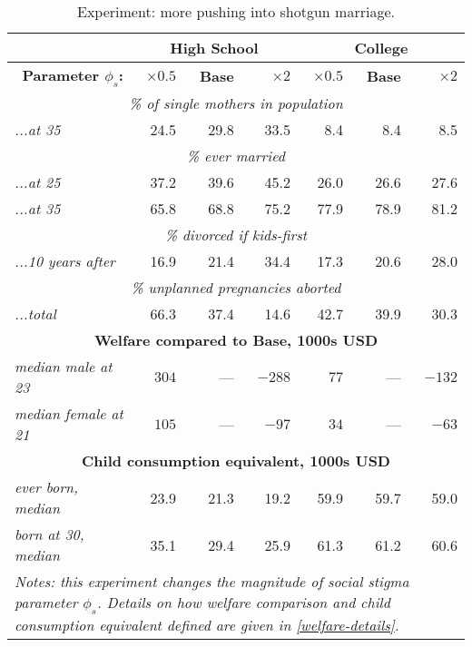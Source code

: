 \documentclass[12pt,letter]{article}
\begin{document}
\begin{table}[h]
\begin{center}
\caption{Experiment: more pushing into shotgun marriage.\label{stigma-table}}
\begin{tabular}{l | r r r | r r r}\hline
& \multicolumn{3}{c|}{\textbf{High School}} & \multicolumn{3}{c}{\textbf{College}} \\\hline
\multicolumn{1}{r|}{\textbf{Parameter $\phi_s$:}}& \textbf{$\times 0.5$} & \textbf{Base} & \textbf{$\times 2$} & \textbf{$\times 0.5$} & \textbf{Base} & \textbf{$\times 2$} \\\hline
\multicolumn{7}{c}{\emph{\% of single mothers in population}} \\\hline
\textit{...at 35}  & 24.5 & 29.8 & 33.5 & 8.4 & 8.4 & 8.5\\\hline
\multicolumn{7}{c}{\emph{\% ever married}} \\\hline
\textit{...at 25}  & 37.2 & 39.6 & 45.2 & 26.0 & 26.6 & 27.6\\
\textit{...at 35}  & 65.8 & 68.8 & 75.2 & 77.9 & 78.9 & 81.2 \\\hline
\multicolumn{7}{c}{\emph{\% divorced if kids-first}} \\\hline
\textit{...10 years after}  & 16.9 & 21.4 & 34.4 & 17.3 & 20.6 & 28.0\\\hline
\multicolumn{7}{c}{\emph{\% unplanned pregnancies aborted}} \\\hline
\textit{...total}  & 66.3 & 37.4 & 14.6 & 42.7 & 39.9 & 30.3\\\hline
\multicolumn{7}{c}{\footnotesize \textbf{Welfare compared to Base, 1000s USD}}\\\hline
\textit{median male at 23}  & $304$ & --- & $-288$ & $77$ & --- & $-132$ \\
\textit{median female at 21} & $105$ & --- & $-97$ & $34$ & --- & $-63$\\\hline
\multicolumn{7}{c}{\footnotesize \textbf{Child consumption equivalent, 1000s USD}}\\\hline
\textit{ever born, median}  & 23.9 & 21.3 & 19.2 & 59.9 & 59.7 & 59.0\\
\textit{born at 30, median}  & 35.1 & 29.4 & 25.9 & 61.3 & 61.2 & 60.6\\\hline
\multicolumn{7}{p{0.7\linewidth}}{\footnotesize \emph{Notes: this experiment changes the magnitude of social stigma parameter $\phi_s$. Details on how welfare comparison and child consumption equivalent defined  are given in \ref{welfare-details}.}}\\\hline\hline
\end{tabular}
\end{center}
\end{table}
\end{document}
